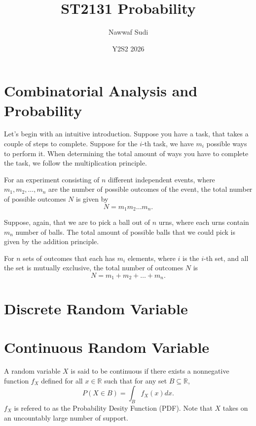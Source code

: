 \documentclass[5pt, a4paper]{article}
\title{ST2131 Probability}
\date{Y2S2 2026}
\author{Nawwaf Sudi}
\begin{document}
    \maketitle
    \newpage
    \tableofcontents
    \newpage
    \section{Combinatorial Analysis and Probability}
    Let's begin with an intuitive introduction. Suppose you have a task, that
    takes a couple of steps to complete. Suppose for the $i$-th task, we have
    $m_i$ possible ways to perform it. When determining the total amount of ways
    you have to complete the task, we follow the multiplication principle. 
    \begin{tcolorbox}[title=Multiplication Principle]
        For an experiment consisting of $n$ different independent events, where
        $m_1,m_2,\ldots,m_n$ are the number of possible outcomes of the event,
        the total number of possible outcomes $N$ is given by \[
            N = m_1m_2\ldots m_n
        .\] 
    \end{tcolorbox}

    Suppose, again, that we are to pick a ball out of $n$ urns, where each urns
    contain $m_n$ number of balls. The total amount of possible balls that we
    could pick is given by the addition principle.
    \begin{tcolorbox}[title=Addition Principle]
        For $n$ sets of outcomes that each has $m_i$ elements, where $i$ is the
        $i$-th set, and all the set is mutually exclusive, the total number of
        outcomes $N$ is  \[
            N = m_1+m_2+\ldots + m_n
        .\] 
    \end{tcolorbox}

    \section{Discrete Random Variable}

    \section{Continuous Random Variable}
    \begin{tcolorbox}[title=Continuous Random Variable]
        A random variable $X$ is said to be continuous if there exists a
        nonnegative function $f_X$ defined for all $x \in \mathbb{R}$ such that
        for any set $B \subseteq \mathbb{R}$, \[
            P(X \in B) = \int_B f_X(x) dx
        .\] 
        $f_X$ is refered to as the Probability Desity Function (PDF). Note that
         $X$ takes on an uncountably large number of support.
    \end{tcolorbox}
\end{document}
